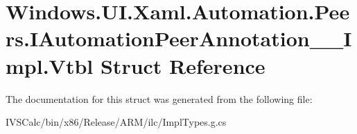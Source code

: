 \hypertarget{struct_windows_1_1_u_i_1_1_xaml_1_1_automation_1_1_peers_1_1_i_automation_peer_annotation_____impl_1_1_vtbl}{}\section{Windows.\+U\+I.\+Xaml.\+Automation.\+Peers.\+I\+Automation\+Peer\+Annotation\+\_\+\+\_\+\+Impl.\+Vtbl Struct Reference}
\label{struct_windows_1_1_u_i_1_1_xaml_1_1_automation_1_1_peers_1_1_i_automation_peer_annotation_____impl_1_1_vtbl}


The documentation for this struct was generated from the following file\+:\begin{DoxyCompactItemize}
\item 
I\+V\+S\+Calc/bin/x86/\+Release/\+A\+R\+M/ilc/Impl\+Types.\+g.\+cs\end{DoxyCompactItemize}
